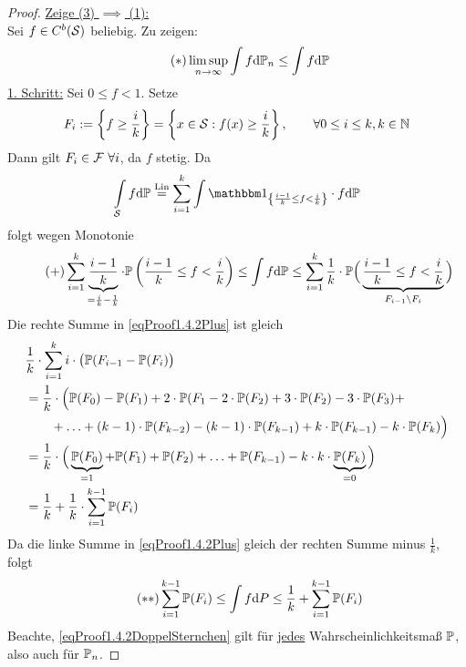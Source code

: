 \begin{proof}
	\underline{Zeige (3) $\implies$ (1):}\\
	Sei $f\in C^b(\S)$ beliebig. Zu zeigen:
	\begin{align}\label{eqProof1.4.2Sternchen}\tag{$\ast$}
		\limsup\limits_{n\to\infty}\int\limits f\d \P_n\leq\int\limits f\d \P
	\end{align}
	\underline{1. Schritt:} Sei $0\leq f<1$. Setze
	\begin{align*}
		F_i:=\left\lbrace f\geq\frac{i}{k}\right\rbrace=\left\lbrace x\in\S:f(x)\geq\frac{i}{k}\right\rbrace,\qquad \forall 0\leq i\leq k,k\in\N
	\end{align*}
	Dann gilt $F_i\in\F~\forall i$, da $f$ stetig. Da 
	\begin{align*}
		\int\limits_{\S}f\d \P
		\stackeq{\text{Lin}}
		\sum\limits_{i=1}^k\int\limits\indi_{\left\lbrace\frac{i-1}{k}\leq f<\frac{i}{k}\right\rbrace}\cdot f\d \P
	\end{align*}
	folgt wegen Monotonie
	\begin{align}\label{eqProof1.4.2Plus}\tag{+}
		\sum\limits_{i=1}^k\underbrace{\frac{i-1}{k}}_{=\frac{i}{k}-\frac{1}{k}}\cdot \P\left(\frac{i-1}{k}\leq f<\frac{i}{k}\right)
		\leq
		\int\limits f\d \P
		\leq
		\sum\limits_{i=1}^k \frac{1}{k}\cdot \P\Big(\underbrace{\frac{i-1}{k}\leq f<\frac{i}{k}}_{F_{i-1}\setminus F_i}\Big)
	\end{align}
	Die rechte Summe in \eqref{eqProof1.4.2Plus} ist gleich
	\begin{align*}
		&\frac{1}{k}\cdot\sum\limits_{i=1}^k i\cdot\big( \P(F_{i-1}-\P(F_i)\big)\\
		&=\frac{1}{k}\cdot\Big(\P(F_0)-\P(F_1)+2\cdot \P(F_1-2\cdot \P(F_2)+3\cdot \P(F_2)-3\cdot \P(F_3)+\\
		&\qquad+\ldots+(k-1)\cdot \P(F_{k-2})-(k-1)\cdot \P(F_{k-1})+k\cdot \P(F_{k-1})-k\cdot \P(F_k)\Big)\\
		&=\frac{1}{k}\cdot\Big(\underbrace{\P(F_0)}_{=1}+\P(F_1)+\P(F_2)+\ldots+\P(F_{k-1})-k\cdot k\cdot \underbrace{\P(F_k)}_{=0}\Big)\\
		&=\frac{1}{k}+\frac{1}{k}\cdot\sum\limits_{i=1}^{k-1} \P(F_i)
	\end{align*}
	Da die linke Summe in \eqref{eqProof1.4.2Plus} gleich der rechten Summe minus $\frac{1}{k}$, folgt
	\begin{align}\label{eqProof1.4.2DoppelSternchen}\tag{$\ast\ast$}
		\sum\limits_{i=1}^{k-1} \P(F_i)
		\leq\int\limits f\d P
		\leq\frac{1}{k}+\sum\limits_{i=1}^{k-1} \P(F_i)
	\end{align}
	Beachte, \eqref{eqProof1.4.2DoppelSternchen} gilt für \ul{jedes} Wahrscheinlichkeitsmaß $\P$, also auch für $\P_n$. 

\end{proof}
